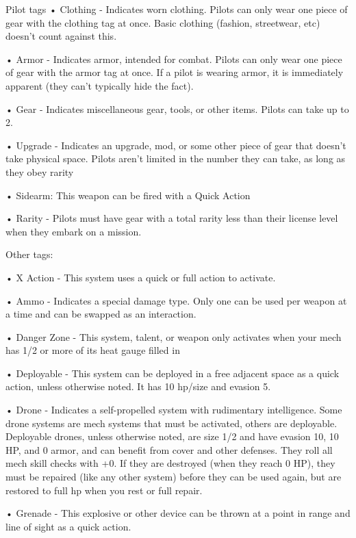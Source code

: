 Pilot tags  
•  Clothing - Indicates worn clothing. Pilots can only wear one piece of gear with the clothing tag  
  at once. Basic clothing (fashion, streetwear, etc) doesn’t count against this.
 
•  Armor - Indicates armor, intended for combat. Pilots can only wear one piece of gear with the  
  armor tag at once. If a pilot is wearing armor, it is immediately apparent (they can’t typically  
  hide the fact).
 
•  Gear - Indicates miscellaneous gear, tools, or other items. Pilots can take up to 2.
 
•  Upgrade - Indicates an upgrade, mod, or some other piece of gear that doesn’t take physical  
  space. Pilots aren’t limited in the number they can take, as long as they obey rarity
 
•  Sidearm: This weapon can be fired with a Quick Action
 
•  Rarity - Pilots must have gear with a total rarity less than their license level when they embark  
  on a mission.  

Other tags:
 
•  X Action - This system uses a quick or full action to activate.
 

                                                                                                                  


•  Ammo - Indicates a special damage type. Only one can be used per weapon at a time and can  
  be swapped as an interaction.
 
•  Danger Zone - This system, talent, or weapon only activates when your mech has 1/2 or more  
  of its heat gauge filled in
 
•  Deployable - This system can be deployed in a free adjacent space as a quick action, unless  
  otherwise noted. It has 10 hp/size and evasion 5.
 
•  Drone - Indicates a self-propelled system with rudimentary intelligence. Some drone systems  
  are mech systems that must be activated, others are deployable. Deployable drones, unless  
  otherwise noted, are size 1/2 and have evasion 10, 10 HP, and 0 armor, and can benefit from  
  cover and other defenses. They roll all mech skill checks with +0. If they are destroyed (when  
  they reach 0 HP), they must be repaired (like any other system) before they can be used again,  
  but are restored to full hp when you rest or full repair.
 
•  Grenade - This explosive or other device can be thrown at a point in range and line of sight as  
  a quick action.
 
